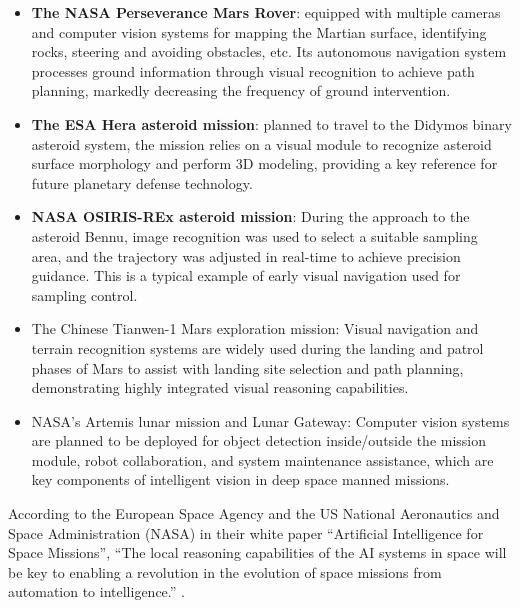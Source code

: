 \begin{itemize}

  \item \textbf{The NASA Perseverance Mars Rover}: equipped with multiple cameras and computer vision systems for mapping the Martian surface, identifying rocks, steering and avoiding obstacles, etc. Its autonomous navigation system processes ground information through visual recognition to achieve path planning, markedly decreasing the frequency of ground intervention. \cite{NASAPerseverance}

   

  \item \textbf{The ESA Hera asteroid mission}: planned to travel to the Didymos binary asteroid system, the mission relies on a visual module to recognize asteroid surface morphology and perform 3D modeling, providing a key reference for future planetary defense technology. \cite{ESAHera}

   

  \item \textbf{NASA OSIRIS-REx asteroid mission}: During the approach to the asteroid Bennu, image recognition was used to select a suitable sampling area, and the trajectory was adjusted in real-time to achieve precision guidance. This is a typical example of early visual navigation used for sampling control. \cite{Lauretta2017}

   

  \item The Chinese Tianwen-1 Mars exploration mission: Visual navigation and terrain recognition systems are widely used during the landing and patrol phases of Mars to assist with landing site selection and path planning, demonstrating highly integrated visual reasoning capabilities. \cite{Tianwen1}

   

  \item NASA's Artemis lunar mission and Lunar Gateway: Computer vision systems are planned to be deployed for object detection inside/outside the mission module, robot collaboration, and system maintenance assistance, which are key components of intelligent vision in deep space manned missions. \cite{NASAArtemis}

\end{itemize}



According to the European Space Agency \cite{ESAHera}and the US National Aeronautics and Space Administration (NASA) in their white paper “Artificial Intelligence for Space Missions”, “The local reasoning capabilities of the AI systems in space will be key to enabling a revolution in the evolution of space missions from automation to intelligence.” \cite{NASA_AI_Space} . 



